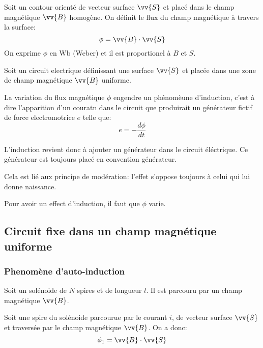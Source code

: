 \begin{definition}
    Soit un contour orienté de vecteur surface $\vv{S}$ et placé dans le champ magnétique $\vv{B}$ homogène. On définit le flux du champ magnétique à travers la surface:
    \[ \phi = \vv{B} \cdot \vv{S} \]
    On exprime $\phi$ en Wb (Weber) et il est proportionel à $B$ et $S$.
\end{definition}

\begin{proposition}
    Soit un circuit electrique définissant une surface $\vv{S}$ et placée dans une zone de champ magnétique $\vv{B}$ uniforme.

    La variation du flux magnétique $\phi$ engendre un phénomèune d'induction, c'est à dire l'apparition d'un couratn dans le circuit que produirait un générateur fictif de force electromotrice $e$ telle que:
    \[ e = - \frac{d\phi}{dt} \]
\end{proposition}

L'induction revient donc à ajouter un générateur dans le circuit éléctrique. Ce générateur est toujours placé en convention générateur.

Cela est lié aux principe de modération: l'effet s'oppose toujours à celui qui lui donne naissance.

\begin{remark}
    Pour avoir un effect d'induction, il faut que $\phi$ varie.
\end{remark}





\subsection{Circuit fixe dans un champ magnétique uniforme}

\subsubsection{Phenomène d'auto-induction}

Soit un solénoide de $N$ spires et de longueur $l$. Il est parcouru par un champ magnétique $\vv{B}$.

Soit une spire du solénoide parcourue par le courant $i$, de vecteur surface $\vv{S}$ et traversée par le champ magnétique $\vv{B}$. On a donc:
\[ \phi_1 = \vv{B} \cdot \vv{S} \]

